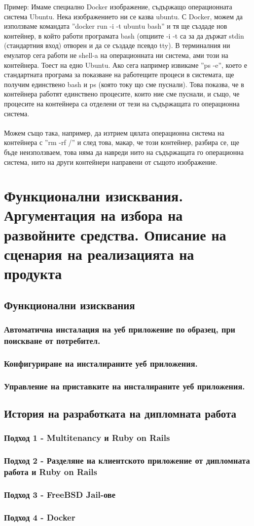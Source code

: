 \documentclass[pdftex,14pt,a4paper]{extreport}
\begin{document}
Пример: Имаме специално Docker изображение, съдържащо операционната система Ubuntu. Нека изображението ни се казва ubuntu. С Docker, можем да използваме командата ''docker run -i -t ubuntu bash'' и тя ще създаде нов контейнер, в който работи програмата bash (опциите -i -t са за да държат stdin (стандартния вход) отворен и да се създаде псевдо tty). В терминалния ни емулатор сега работи не shell-a на операционната ни система, ами този на контейнера. Тоест на едно Ubuntu. Ако сега например извикаме ''ps -e'', което е стандартната програма за показване на работещите процеси в системата, ще получим единствено bash и ps (която току що сме пуснали). Това показва, че в контейнера работят единствено процесите, които ние сме пуснали, и също, че процесите на контейнера са отделени от тези на съдържащата го операционна система.
\\\\
Можем също така, например, да изтрием цялата операционна система на контейнера с ''rm -rf /'' и след това, макар, че този контейнер, разбира се, ще бъде неизползваем, това няма да навреди нито на съдържащата го операционна система, нито на други контейнери направени от същото изображение.
\chapter {Функционални изисквания. Аргументация на избора на развойните средства. Описание на сценария на реализацията на продукта}
\section {Функционални изисквания}
\subsection {Автоматична инсталация на уеб приложение по образец, при поискване от потребител.}
\subsection {Конфигуриране на инсталираните уеб приложения.}
\subsection {Управление на приставките на инсталираните уеб приложения.}
\section {История на разработката на дипломната работа}
\subsection {Подход 1 - Multitenancy и Ruby on Rails}
\subsection {Подход 2 - Разделяне на клиентското приложение от дипломната работа и Ruby on Rails}
\subsection {Подход 3 - FreeBSD Jail-ове}
\subsection {Подход 4 - Docker}
%
%
\end{document}
